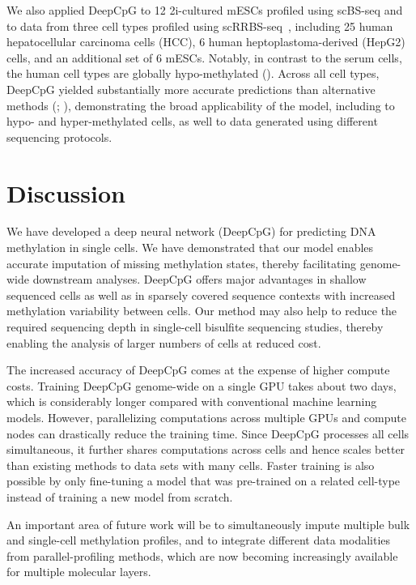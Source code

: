 We also applied DeepCpG to 12 2i-cultured mESCs profiled using scBS-seq and to data from three cell types profiled using scRRBS-seq~\citep{hou_single-cell_2016}, including 25 human hepatocellular carcinoma cells (HCC), 6 human heptoplastoma-derived (HepG2) cells, and an additional set of 6 mESCs. Notably, in contrast to the serum cells, the human cell types are globally hypo-methylated (). Across all cell types, DeepCpG yielded substantially more accurate predictions than alternative methods (; ), demonstrating the broad applicability of the model, including to hypo- and hyper-methylated cells, as well to data generated using different sequencing protocols.


\section{Discussion}

We have developed a deep neural network (DeepCpG) for predicting DNA methylation in single cells. We have demonstrated that our model enables accurate imputation of missing methylation states, thereby facilitating genome-wide downstream analyses. DeepCpG offers major advantages in shallow sequenced cells as well as in sparsely covered sequence contexts with increased methylation variability between cells. Our method may also help to reduce the required sequencing depth in single-cell bisulfite sequencing studies, thereby enabling the analysis of larger numbers of cells at reduced cost.

The increased accuracy of DeepCpG comes at the expense of higher compute costs. Training DeepCpG genome-wide on a single GPU takes about two days, which is considerably longer compared with conventional machine learning models. However, parallelizing computations across multiple GPUs and compute nodes can drastically reduce the training time. Since DeepCpG processes all cells simultaneous, it further shares computations across cells and hence scales better than existing methods to data sets with many cells. Faster training is also possible by only fine-tuning a model that was pre-trained on a related cell-type instead of training a new model from scratch.

An important area of future work will be to simultaneously impute multiple bulk and single-cell methylation profiles, and to integrate different data modalities from parallel-profiling methods, which are now becoming increasingly available for multiple molecular layers.
